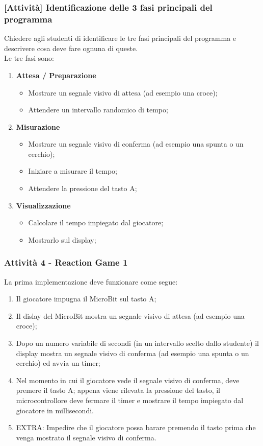 \documentclass[../../docenti.tex]{subfiles}
\begin{document}
\subsubsection{[Attività] Identificazione delle 3 fasi principali del programma}
Chiedere agli studenti di identificare le tre fasi principali del programma e descrivere cosa deve fare ognuna di queste.\\
Le tre fasi sono:
\begin{enumerate}
	\item \textbf{Attesa / Preparazione}
	\begin{itemize}
		\item Mostrare un segnale visivo di attesa (ad esempio una croce);
		\item Attendere un intervallo randomico di tempo;
	\end{itemize}
	\item \textbf{Misurazione}
	\begin{itemize}
		\item Mostrare un segnale visivo di conferma (ad esempio una spunta o un cerchio);
		\item Iniziare a misurare il tempo;
		\item Attendere la pressione del tasto A;
	\end{itemize}
	\item \textbf{Visualizzazione}
	\begin{itemize}
		\item Calcolare il tempo impiegato dal giocatore;
		\item Mostrarlo sul display;
	\end{itemize}
\end{enumerate}

\subsubsection{Attività 4 - Reaction Game 1}

La prima implementazione deve funzionare come segue:
\begin{enumerate}
	\item Il giocatore impugna il MicroBit sul tasto A;
	\item Il dislay del MicroBit mostra un segnale visivo di attesa (ad esempio una croce);
	\item Dopo un numero variabile di secondi (in un intervallo scelto dallo studente) il display mostra un segnale visivo di conferma (ad esempio una spunta o un cerchio) ed avvia un timer;
	\item Nel momento in cui il giocatore vede il segnale visivo di conferma, deve premere il tasto A; appena viene rilevata la pressione del tasto, il microcontrollore deve fermare il timer e mostrare il tempo impiegato dal giocatore in millisecondi.
	\item EXTRA: Impedire che il giocatore possa barare premendo il tasto prima che venga mostrato il segnale visivo di conferma.
\end{enumerate}
\end{document}

